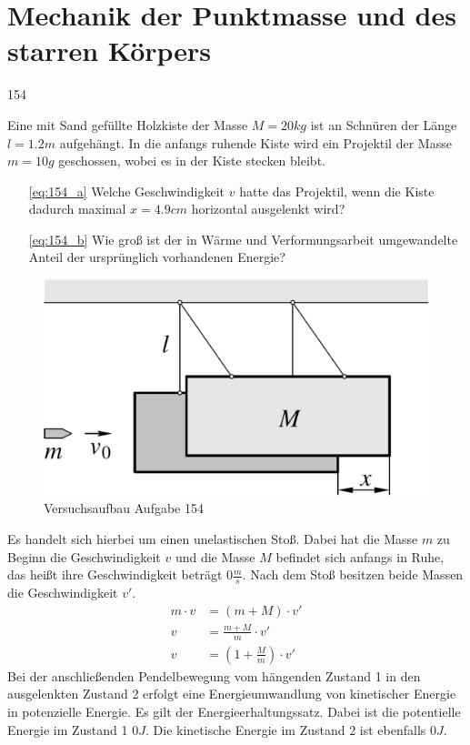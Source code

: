 \section{Mechanik der Punktmasse und des starren Körpers}
\begin{auf}
    154
\end{auf}
Eine mit Sand gefüllte Holzkiste der Masse $M=20kg$ ist an Schnüren der Länge $l=1.2m$ aufgehängt. In die anfangs ruhende Kiste wird ein Projektil der Masse $m=10g$ geschossen, wobei es in der Kiste stecken bleibt.
\begin{enumerate}
    \item[\ref{eq:154_a}] Welche Geschwindigkeit $v$ hatte das Projektil, wenn die Kiste dadurch maximal $x=4.9 cm$ horizontal ausgelenkt wird?
    \item[\ref{eq:154_b}] Wie groß ist der in Wärme und Verformungsarbeit umgewandelte Anteil der ursprünglich vorhandenen Energie?
\end{enumerate}
\begin{figure}[h]
    \centering
    \includegraphics[width=0.7\linewidth]{images/154_0.png}
    \caption{Versuchsaufbau Aufgabe 154}
\end{figure}
Es handelt sich hierbei um einen unelastischen Stoß. Dabei hat die Masse $m$ zu Beginn die Geschwindigkeit $v$ und die Masse $M$ befindet sich anfangs in Ruhe, das heißt ihre Geschwindigkeit beträgt $0\frac{m}{s}$. Nach dem Stoß besitzen beide Massen die Geschwindigkeit $v'$.
\begin{align}
    m\cdot v &= (m+M)\cdot v'				\nonumber\\
    v&=\frac{m+M}{m}\cdot v' 				\nonumber\\
    v&=\left(1+\frac{M}{m}\right)\cdot v'	\label{eq:154_velocity0}
\end{align}
Bei der anschließenden Pendelbewegung vom hängenden Zustand 1 in den ausgelenkten Zustand 2 erfolgt eine Energieumwandlung von kinetischer Energie in potenzielle Energie. Es gilt der Energieerhaltungssatz. Dabei ist die potentielle Energie im Zustand 1 $0J$. Die kinetische Energie im Zustand 2 ist ebenfalls $0J$.
